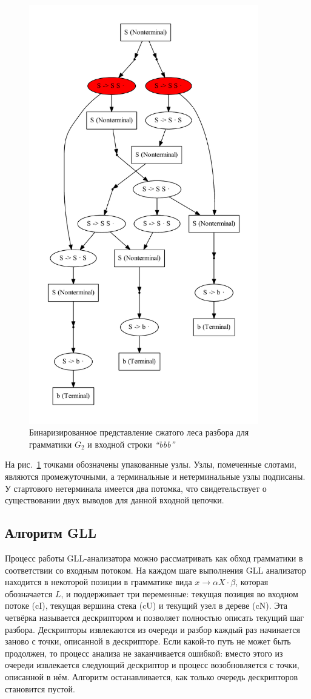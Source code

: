 \documentclass[14pt]{matmex-diploma}
\begin{document}
\begin{figure}
 \centering
 \includegraphics[width=10cm]{pics/GLLSppf.pdf}
 \caption{Бинаризированное представление сжатого леса разбора для грамматики $G_2$ и входной строки {\it ``bbb''} }
 \label{SPPF2}
\end{figure}

На рис.~\ref{SPPF2} точками обозначены упакованные узлы. Узлы, помеченные слотами, являются промежуточными, а терминальные и нетерминальные узлы подписаны. У стартового нетерминала имеется два потомка, что свидетельствует о существовании двух выводов для данной входной цепочки.

\subsection{Алгоритм GLL}
Процесс работы GLL-анализатора можно рассматривать как обход грамматики в соответствии со входным потоком. На каждом шаге выполнения GLL анализатор находится в некоторой позиции в грамматике вида $x \rightarrow \alpha X \cdot \beta$, которая обозначается $L$, и поддерживает три переменные: текущая позиция во входном потоке (cI), текущая вершина стека (cU) и текущий узел в дереве (cN). Эта четвёрка называется дескриптором и позволяет полностью описать текущий шаг разбора. Дескрипторы извлекаются из очереди и разбор каждый раз начинается заново с точки, описанной в дескрипторе. Если какой-то путь не может быть продолжен, то процесс анализа не заканчивается ошибкой: вместо этого из очереди извлекается следующий дескриптор и процесс возобновляется с точки, описанной в нём. Алгоритм останавливается, как только очередь дескрипторов становится пустой.
\end{document}
